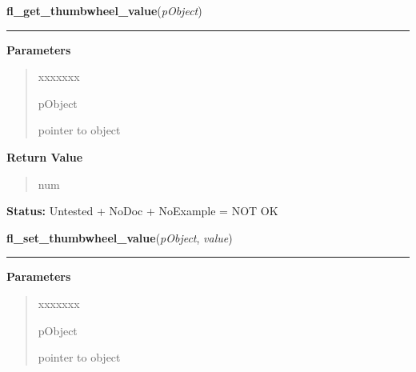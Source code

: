 \hspace{.8\funcindent}\begin{boxedminipage}{\funcwidth}

    \raggedright \textbf{fl\_get\_thumbwheel\_value}(\textit{pObject})

    \vspace{-1.5ex}

    \rule{\textwidth}{0.5\fboxrule}
\setlength{\parskip}{2ex}
\setlength{\parskip}{1ex}
      \textbf{Parameters}
      \vspace{-1ex}

      \begin{quote}
        \begin{Ventry}{xxxxxxx}

          \item[pObject]

          pointer to object

        \end{Ventry}

      \end{quote}

      \textbf{Return Value}
    \vspace{-1ex}

      \begin{quote}
      num

      \end{quote}

\textbf{Status:} Untested + NoDoc + NoExample = NOT OK



    \end{boxedminipage}

    \label{xformslib:library:fl_set_thumbwheel_value}

    \vspace{0.5ex}

\hspace{.8\funcindent}\begin{boxedminipage}{\funcwidth}

    \raggedright \textbf{fl\_set\_thumbwheel\_value}(\textit{pObject}, \textit{value})

    \vspace{-1.5ex}

    \rule{\textwidth}{0.5\fboxrule}
\setlength{\parskip}{2ex}
\setlength{\parskip}{1ex}
      \textbf{Parameters}
      \vspace{-1ex}

      \begin{quote}
        \begin{Ventry}{xxxxxxx}

          \item[pObject]

          pointer to object

        \end{Ventry}

      \end{quote}

    \end{boxedminipage}

